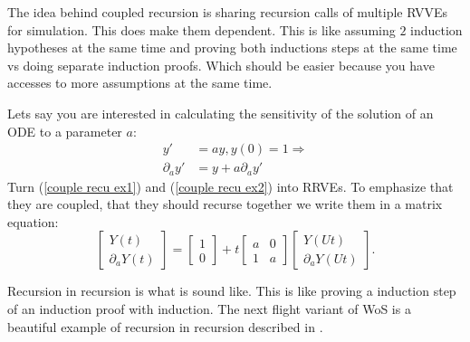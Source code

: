 \documentclass[a4paper,12pt]{article}
\begin{document}
\begin{technique}
    The idea behind coupled recursion is sharing recursion calls of
    multiple RVVEs for simulation. This does make them dependent.
    This is like assuming $2$ induction hypotheses at the same
    time and proving both inductions steps at the same time vs
    doing separate induction proofs. Which should be easier
    because you have accesses to more assumptions at the same time.
\end{technique}

\begin{example}
    Lets say you are interested in calculating the
    sensitivity of the solution of an ODE to a
    parameter $a$:
    \begin{align}
        y'             & =ay,y(0)=1 \Rightarrow \label{couple recu ex1} \\
        \partial_{a}y' & = y + a \partial_{a}y' \label{couple recu ex2}
    \end{align}
    Turn (\ref{couple recu ex1}) and (\ref{couple recu ex2}) into RRVEs.
    To emphasize that they are coupled, that they should
    recurse together we write them in a matrix equation:
    \begin{equation} \label{coupled mat}
        \begin{bmatrix}
            Y(t) \\
            \partial_{a}Y(t)
        \end{bmatrix}=
        \begin{bmatrix}
            1 \\
            0
        \end{bmatrix}+
        t \begin{bmatrix}
            a & 0 \\
            1 & a
        \end{bmatrix}
        \begin{bmatrix}
            Y(Ut) \\
            \partial_{a}Y(Ut)
        \end{bmatrix}.
    \end{equation}

\end{example}

\begin{pythonn} 
\end{pythonn}

\begin{technique}
    Recursion in recursion is what is sound like. This is like proving a induction
    step of an induction proof with induction. The next flight variant of WoS
    is a beautiful example of recursion in recursion described in
    \cite{sawhney_grid-free_2022}.
\end{technique}
\end{document}
